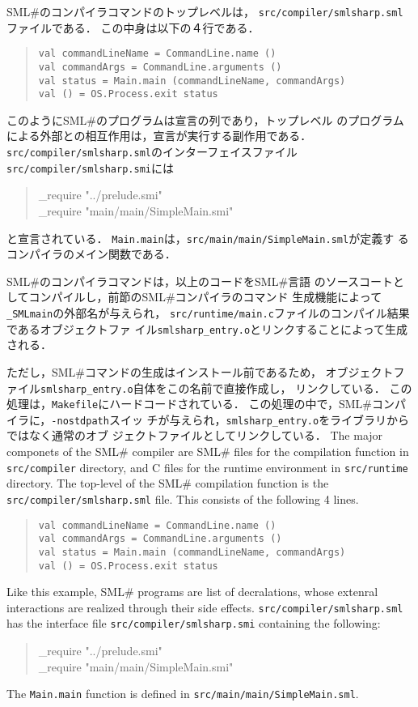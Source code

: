 \documentclass{jbook}
\newcommand{\smlsharp}{SML\#}
\newcommand{\code}[1]{\mbox{\large\tt #1}}
\newenvironment{program}{\begin{quote}\begin{tt}}%
                        {\end{tt}\end{quote}}
\begin{document}
	\smlsharp{}のコンパイラコマンドのトップレベルは，
\code{src/compiler/smlsharp.sml}ファイルである．
	この中身は以下の４行である．
\begin{quote}
\code{val commandLineName = CommandLine.name ()}
\\
\code{val commandArgs = CommandLine.arguments ()}
\\
\code{val status = Main.main (commandLineName, commandArgs)}
\\
\code{val () = OS.Process.exit status}
\end{quote}
	このように\smlsharp{}のプログラムは宣言の列であり，トップレベル
のプログラムによる外部との相互作用は，宣言が実行する副作用である．
	\code{src/compiler/smlsharp.sml}のインターフェイスファイル
\code{src/compiler/smlsharp.smi}には
\begin{program}
\_require "../prelude.smi"
\\
\_require "main/main/SimpleMain.smi"
\end{program}
と宣言されている．
	\code{Main.main}は，\code{src/main/main/SimpleMain.sml}が定義す
るコンパイラのメイン関数である．

	\smlsharp{}のコンパイラコマンドは，以上のコードを\smlsharp{}言語
のソースコートとしてコンパイルし，前節の\smlsharp{}コンパイラのコマンド
生成機能によって\code{\_SMLmain}の外部名が与えられ，
\code{src/runtime/main.c}ファイルのコンパイル結果であるオブジェクトファ
イル\code{smlsharp\_entry.o}とリンクすることによって生成される．

	ただし，\smlsharp{}コマンドの生成はインストール前であるため，
オブジェクトファイル\code{smlsharp\_entry.o}自体をこの名前で直接作成し，
リンクしている．
	この処理は，\code{Makefile}にハードコードされている．
	この処理の中で，\smlsharp{}コンパイラに，\code{-nostdpath}スイッ
チが与えられ，\code{smlsharp\_entry.o}をライブラリからではなく通常のオブ
ジェクトファイルとしてリンクしている．
\else%
	The major componets of the \smlsharp{} compiler are 
\smlsharp{} files for the compilation function in \code{src/compiler}
directory, and C files for the runtime environment in \code{src/runtime}
directory.
	The top-level of the \smlsharp{} compilation function is the
\code{src/compiler/smlsharp.sml} file.
	This consists of the following 4 lines.
\begin{quote}
\code{val commandLineName = CommandLine.name ()}
\\
\code{val commandArgs = CommandLine.arguments ()}
\\
\code{val status = Main.main (commandLineName, commandArgs)}
\\
\code{val () = OS.Process.exit status}
\end{quote}
	Like this example, \smlsharp{} programs are list of
decralations, whose extenral interactions are realized through 
their side effects.
	\code{src/compiler/smlsharp.sml} has the interface file
\code{src/compiler/smlsharp.smi} containing the following:
\begin{program}
\_require "../prelude.smi"
\\
\_require "main/main/SimpleMain.smi"
\end{program}
	The \code{Main.main} function is defined in
\code{src/main/main/SimpleMain.sml}.
\end{document}
